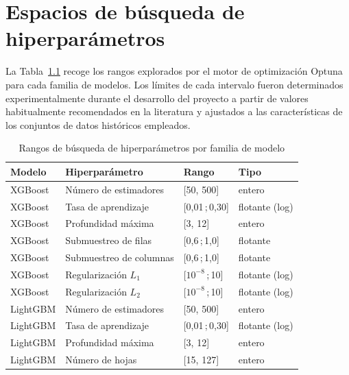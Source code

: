\chapter{Espacios de búsqueda de hiperparámetros}
\label{anx:hiperparametros}

La Tabla~\ref{tab:search_spaces} recoge los rangos explorados por el motor de
optimización Optuna para cada familia de modelos. Los límites de cada intervalo
fueron determinados experimentalmente durante el desarrollo del proyecto a
partir de valores habitualmente recomendados en la literatura
\parencite{chen_xgboost_2016,ke_lightgbm_2017,goodfellow_deep_2016} y ajustados
a las características de los conjuntos de datos históricos empleados.

\begin{table}[H]
    \centering
    \caption{Rangos de búsqueda de hiperparámetros por familia de modelo}
    \label{tab:search_spaces}
    \begin{tabular}{llll}
        \hline
        \textbf{Modelo} & \textbf{Hiperparámetro} & \textbf{Rango} & \textbf{Tipo} \\
        \hline
        XGBoost & Número de estimadores       & {[}50, 500{]}             & entero \\
        XGBoost & Tasa de aprendizaje          & {[}0,01\,;\,0,30{]}       & flotante (log) \\
        XGBoost & Profundidad máxima           & {[}3, 12{]}               & entero \\
        XGBoost & Submuestreo de filas         & {[}0,6\,;\,1,0{]}         & flotante \\
        XGBoost & Submuestreo de columnas      & {[}0,6\,;\,1,0{]}         & flotante \\
        XGBoost & Regularización $L_1$         & {[}$10^{-8}$\,;\,10{]}    & flotante (log) \\
        XGBoost & Regularización $L_2$         & {[}$10^{-8}$\,;\,10{]}    & flotante (log) \\
        \hline
        LightGBM & Número de estimadores      & {[}50, 500{]}             & entero \\
        LightGBM & Tasa de aprendizaje         & {[}0,01\,;\,0,30{]}       & flotante (log) \\
        LightGBM & Profundidad máxima          & {[}3, 12{]}               & entero \\
        LightGBM & Número de hojas             & {[}15, 127{]}             & entero \\

\end{tabular}
\end{table}
